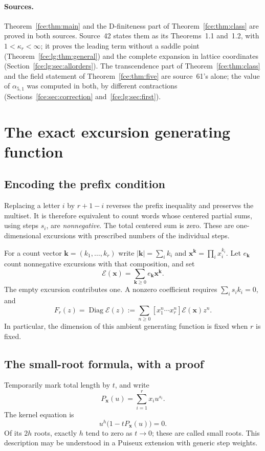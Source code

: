 \documentclass[11pt,a4paper]{article}
\numberwithin{equation}{section}
\theoremstyle{definition}\newtheorem{definition}[theorem]{Definition}
\theoremstyle{remark}\newtheorem{remark}[theorem]{Remark}
\newcommand{\diag}{\operatorname{Diag}}
\newcommand{\E}{\mathcal E}
\begin{document}
\paragraph{Sources.} Theorem~\ref{fce:thm:main} and the D-finiteness part
of Theorem~\ref{fce:thm:class} are proved in both sources. Source~42 states
them as its Theorems~1.1 and~1.2, with $1<\kappa_r<\infty$; it proves the
leading term without a saddle point (Theorem~\ref{fce:lg:thm:general}) and
the complete expansion in lattice coordinates
(Section~\ref{fce:lg:sec:allorders}). The transcendence part of
Theorem~\ref{fce:thm:class} and the field statement of
Theorem~\ref{fce:thm:five} are source~61's alone; the value of
$\alpha_{5,1}$ was computed in both, by different contractions
(Sections~\ref{fce:sec:correction} and~\ref{fce:lg:sec:first}).

\section{The exact excursion generating function}
\subsection{Encoding the prefix condition}\label{fce:sec:encoding}
Replacing a letter $i$ by $r+1-i$ reverses the prefix inequality and preserves
the multiset. It is therefore equivalent to count words whose centered
partial sums, using steps $s_i$, are \emph{nonnegative}. The total centered
sum is zero. These are one-dimensional excursions with prescribed numbers
of the individual steps.

For a count vector $\boldsymbol k=(k_1,\ldots,k_r)$ write
$|\boldsymbol k|=\sum_i k_i$ and
$\boldsymbol x^{\boldsymbol k}=\prod_i x_i^{k_i}$.
Let $e_{\boldsymbol k}$ count nonnegative excursions with that composition,
and set
\begin{equation}\label{fce:eq:ambient}
 \E(\boldsymbol x)=\sum_{\boldsymbol k\ge0}
 e_{\boldsymbol k}\boldsymbol x^{\boldsymbol k}.
\end{equation}
The empty excursion contributes one. A nonzero coefficient requires
$\sum_i s_i k_i=0$, and
\begin{equation}\label{fce:eq:diag}
 F_r(z)=\diag\E(z)
 :=\sum_{n\ge0}[x_1^n\cdots x_r^n]\E(\boldsymbol x)z^n.
\end{equation}
In particular, the dimension of this ambient generating function is fixed
when $r$ is fixed.

\subsection{The small-root formula, with a proof}
Temporarily mark total length by $t$, and write
\[
 P_{\boldsymbol x}(u)=\sum_{i=1}^r x_i u^{s_i}.
\]
The kernel equation is
\begin{equation}\label{fce:eq:kernel}
 u^h\bigl(1-tP_{\boldsymbol x}(u)\bigr)=0.
\end{equation}
Of its $2h$ roots, exactly $h$ tend to zero as $t\to0$; these are called
small roots. This description may be understood in a Puiseux extension
with generic step weights.
\end{document}
